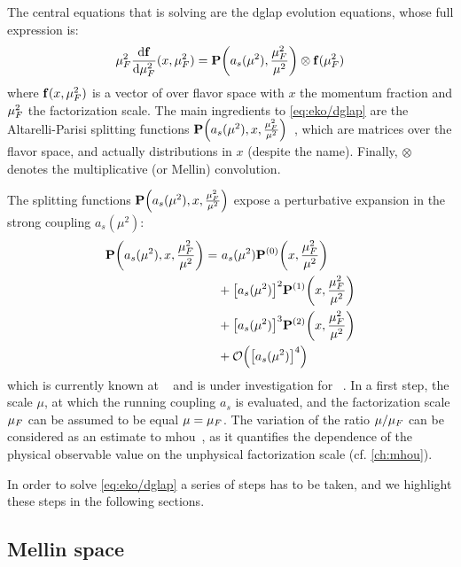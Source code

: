 
The central equations that \eko is solving are the \acrfull{dglap} evolution
equations, whose full expression is:
\begin{equation}
  \muF^2 \dv{\vb f}{\muF^2}{}(x,\muF^2) = \vb P\qty(a_s(\mu^2),\frac{\muF^2}{\mu^2}) \otimes \vb f(\muF^2)
	\label{eq:eko/dglap}
\end{equation}
where $\vb f(x,\mu_F^2)$ is a vector of \pdfs over flavor space with $x$ the
momentum fraction and $\mu_F^2$ the factorization scale. The main ingredients to
\cref{eq:eko/dglap} are the Altarelli-Parisi splitting functions $\vb
P\qty(a_s(\mu^2),x,\frac{\mu_F^2}{\mu^2})$~\cite{Moch:2004pa,Vogt:2004mw}, which
are matrices over the flavor space, and actually distributions in $x$ (despite
the name).
Finally, $\otimes$ denotes the multiplicative (or Mellin) convolution.

The splitting functions $\vb P\qty(a_s(\mu^2),x,\frac{\mu_F^2}{\mu^2})$ expose a
perturbative expansion in the strong coupling $a_s(\mu^2)$:
\begin{align}
  \vb P\qty(a_s(\mu^2),x,\frac{\muF^2}{\mu^2}) =
  &~ a_s(\mu^2) \vb P^{(0)}\qty(x,\frac{\muF^2}{\mu^2})\nonumber\\
  &+ \qty[a_s(\mu^2)]^2 \vb P^{(1)}\qty(x,\frac{\muF^2}{\mu^2})\nonumber\\
  &+ \qty[a_s(\mu^2)]^3 \vb P^{(2)}\qty(x,\frac{\muF^2}{\mu^2})\nonumber\\
  &+ \order{\qty[a_s(\mu^2)]^4}
\end{align}
which is currently known at \nnlo{}~\cite{Moch:2004pa,Vogt:2004mw,Blumlein:2021enk} and is under
investigation for \nnnlo{}~\cite{Moch:2021qrk}.
In a first step, the scale $\mu$, at which the running coupling $a_s$ is
evaluated, and the factorization scale $\mu_F$ can be assumed to be equal $\mu =
\mu_F$.
The variation of the ratio $\mu/\mu_F$ can be considered as an estimate to
\acrfull{mhou}~\cite{AbdulKhalek:2019ihb}, as it quantifies the dependence of
the physical observable value on the unphysical factorization scale (cf.
\cref{ch:mhou}).

In order to solve \cref{eq:eko/dglap} a series of steps has to be taken, and we
highlight these steps in the following sections.

\subsection{Mellin space}
\label{sec:theory:mellin}


